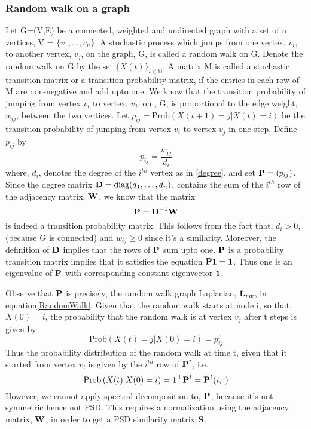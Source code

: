 \subsubsection{Random walk on a graph}
Let G=(V,E) be a connected, weighted and undirected graph with a set of n vertices, V = $\{v_{1}, \dots, v_{n} \}$.
A stochastic process which jumps from one vertex, $v_{i}$, to another vertex, $v_{j}$, on the graph, G, is called a random walk on G.
Denote the random walk on G by the set $\{X(t)\}_{t \in \mathbb{N}}$.
A matrix M is called a stochastic transition matrix or a transition probability
matrix, if the entries in each row of M are non-negative and add upto one.
We know that the transition probability of jumping from vertex $v_{i}$
to vertex, $v_{j}$, on , G, is proportional to the edge weight, $w_{ij}$, between the two vertices. 
Let $p_{ij} = \text{Prob} \left(X(t+1) = j | X(t) = i \right)$ be the transition probability of jumping from vertex $v_{i}$ to vertex $v_{j}$ in one step. Define $p_{ij}$ by
\begin{equation}
p_{ij}   = \frac{w_{ij}}{d_{i}}
\end{equation}
where, $d_{i}$,  denotes the degree of the $i^{th}$ vertex as in \eqref{degree}, and 
set $\textbf{P} = (p_{ij})$. Since the degree matrix $\textbf{D} = \text{diag}(d_{1}, \ldots, d_{n})$, contains the sum of the $i^{th}$ row of the adjacency matrix, $\textbf{W}$,
we know that the matrix 
\begin{equation}\label{transitmatrix}
\textbf{P} = \textbf{D}^{-1}\textbf{W} 
\end{equation}
is indeed a transition probability matrix. This follows from the fact that, $d_{i} > 0$, (because G is connected) and $w_{ij} \geq 0$ since it's a similarity. Moreover, the definition of $\textbf{D}$ implies that the rows of $\textbf{P}$ sum upto one. 
$\textbf{P}$ is a probability transition matrix implies that it satisfies
the equation $\textbf{P} \boldsymbol{1} = \boldsymbol{1}$. Thus one is an eigenvalue of 
$\textbf{P}$ with corresponding constant eigenvector $\boldsymbol{1}$.

Observe that $\textbf{P}$ is precisely, the random walk graph Laplacian, $\textbf{L}_{rw}$, in equation\eqref{RandomWalk}.
Given that the random walk starts at node i, so that, $X(0) = i$, the probability
that the random walk is at vertex $v_{j}$ after t steps is given by
\[
\text{Prob}\left( X(t) = j | X(0) = i  \right) = p_{ij}^{t}
\]
Thus the probability distribution of the random walk at time t, given that it started from vertex $v_{i}$ is given by the  $i^{th}$ row of $\textbf{P}^{t}$, i.e.
\begin{equation}\label{pdftime}
\text{Prob}\left( X(t) | X(0) = i  \right) = \boldsymbol{1}^{\top}\textbf{P}^{t} = \textbf{P}^{t}(i, :)
\end{equation}
However, we cannot apply spectral decomposition to, $\textbf{P}$, because it's
not symmetric hence not PSD.
This requires a normalization using the adjacency matrix, $\textbf{W}$, in order
to get a PSD similarity matrix $\textbf{S}$.

